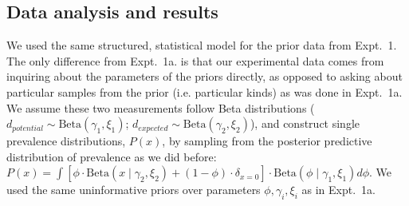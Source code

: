 \documentclass[12pt,letterpaper]{article}
\newcommand{\ndg}[1]{\textcolor{Green}{[ndg: #1]}}
\begin{document}
%

\subsection*{Data analysis and results}

We used the same structured, statistical model for the prior data from Expt.~1.
The only difference from Expt.~1a. is that our experimental data comes from inquiring about the parameters of the priors directly, as opposed to asking about particular samples from the prior (i.e. particular kinds) as was done in Expt.~1a. 
We assume these two measurements follow Beta distributions ($d_{potential} \sim \text{Beta}(\gamma_{1}, \xi_{1})$; $
d_{expected} \sim \text{Beta}(\gamma_{2}, \xi_{2})$), and construct single prevalence distributions, $P(x)$, by sampling from the posterior predictive distribution of prevalence as we did before: $P(x) = \int [ \phi\cdot \text{Beta} (x \mid \gamma_{2}, \xi_{2}) + (1 -  \phi) \cdot \delta_{x=0} ] \cdot \text{Beta}(\phi \mid \gamma_{1}, \xi_{1}) d\phi$.
We used the same uninformative priors over parameters $\phi, \gamma_{i}, \xi_{i}$ as in Expt.~1a.
%
%
\end{document}
